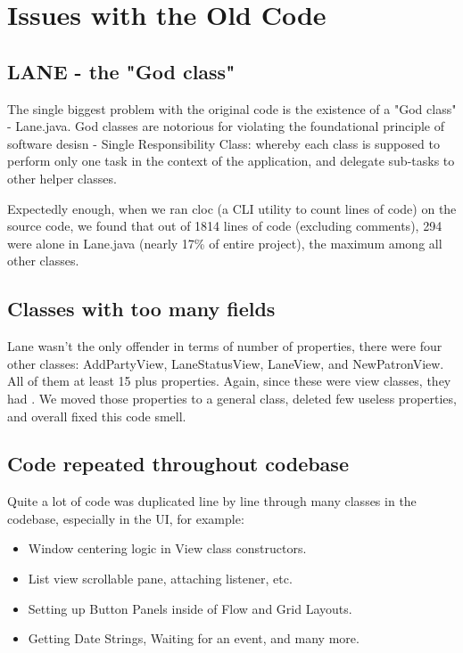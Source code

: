 \section{Issues with the Old Code}

\subsection{LANE - the "God class"}

The single biggest problem with the original code is the existence of a "God class" - Lane.java. God classes are notorious for violating the foundational principle of software desisn - Single Responsibility Class: whereby each class is supposed to perform only one task in the context of the application, and delegate sub-tasks to other helper classes.

Expectedly enough, when we ran \textrm{cloc} (a CLI utility to count lines of code) on the source code, we found that out of 1814 lines of code (excluding comments), 294 were alone in Lane.java (nearly 17\% of entire project), the maximum among all other classes.

\subsection{Classes with too many fields}

Lane wasn't the only offender in terms of number of properties, there were four other classes: AddPartyView, LaneStatusView, LaneView, and NewPatronView. All of them at least 15 plus properties. Again, since these were view classes, they had . We moved those properties to a general  class, deleted few useless properties, and overall fixed this code smell.

\subsection{Code repeated throughout codebase}

Quite a lot of code was duplicated line by line through many classes in the codebase, especially in the UI, for example:

\begin{itemize}
	\item Window centering logic in View class constructors.
	\item List view scrollable pane, attaching listener, etc.
	\item Setting up Button Panels inside of Flow and Grid Layouts.
	\item Getting Date Strings, Waiting for an event, and many more.
\end{itemize}

